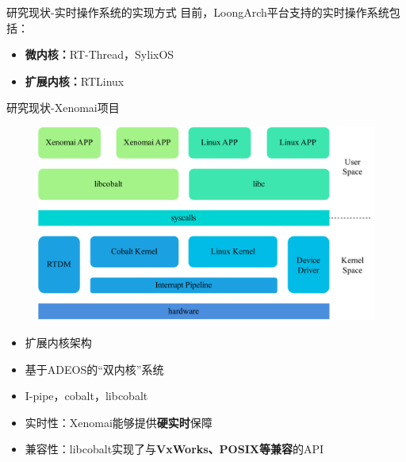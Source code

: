 \documentclass{beamer}
\begin{document}
\begin{frame}{研究现状-实时操作系统的实现方式}
    目前，LoongArch平台支持的实时操作系统包括：
    \begin{itemize}
        \item \textbf{微内核：}RT-Thread，SylixOS
        \item \textbf{扩展内核：}RTLinux
    \end{itemize}
\end{frame}

\begin{frame}{研究现状-Xenomai项目}
    \begin{minipage}{0.45\linewidth}
        \begin{figure}[h]
            \centering
            \includegraphics[height=.45\textheight]{img/Img/xenomai-prj.pdf}
        \end{figure}
    \end{minipage}\hspace{1.5cm}
    \begin{minipage}{0.35\linewidth}
        \begin{itemize}
            \item 扩展内核架构
            \item 基于ADEOS的“双内核”系统
            \item I-pipe，cobalt，libcobalt
        \end{itemize}
    \end{minipage}
    \medskip
    \begin{itemize}
        \item 实时性：Xenomai能够提供\textbf{硬实时}保障
        \item 兼容性：libcobalt实现了与\textbf{VxWorks、POSIX等兼容}的API
    \end{itemize}
\end{frame}
\end{document}
